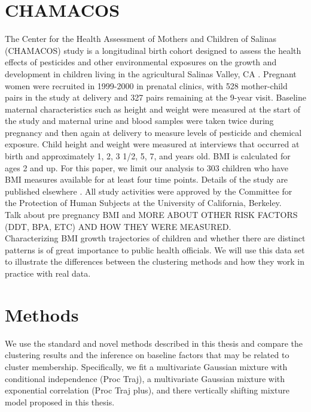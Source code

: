 \documentclass[11pt]{article}
\begin{document}
\section{CHAMACOS}
The Center for the Health Assessment of Mothers and Children of Salinas (CHAMACOS) study is a longitudinal birth cohort designed to assess the health effects of pesticides and other environmental exposures on the growth and development in children living in the agricultural Salinas Valley, CA \cite{eskenazi2004,eskenazi2005}. Pregnant women were recruited in 1999-2000 in prenatal clinics, with 528 mother-child pairs in the study at delivery and 327 pairs remaining at the 9-year visit. Baseline maternal characteristics such as height and weight were measured at the start of the study and maternal urine and blood samples were taken twice during pregnancy and then again at delivery to measure levels of pesticide and chemical exposure. Child height and weight  were measured at interviews that occurred at birth and approximately 1, 2, 3 1/2, 5, 7, and years old. BMI is calculated for ages 2 and up. For this paper, we limit our analysis to 303 children who have BMI measures available for at least four time points. Details of the study are published elsewhere \cite{eskenazi2003}. All study activities were approved by the Committee for the Protection of Human Subjects at the University of California, Berkeley. \\

Talk about pre pregnancy BMI and MORE ABOUT OTHER RISK FACTORS (DDT, BPA, ETC) AND HOW THEY WERE MEASURED.\\

Characterizing BMI growth trajectories of children and whether there are distinct patterns is of great importance to public health officials. We will use this data set to illustrate the differences between the clustering methods and how they work in practice with real data.\\

\section{Methods}
We use the standard and novel methods described in this thesis and compare the clustering results and the inference on baseline factors that may be related to cluster membership. Specifically, we fit a multivariate Gaussian mixture with conditional independence (Proc Traj), a multivariate Gaussian mixture with exponential correlation (Proc Traj plus), and there vertically shifting mixture model proposed in this thesis.\\
\end{document}
